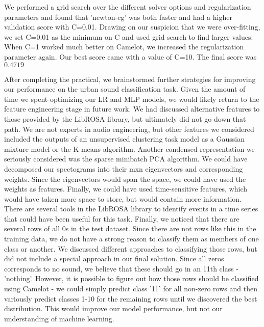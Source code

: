 \documentclass[11pt]{article}
\begin{document}
We performed a grid search over the different solver options and regularization parameters and found that 'newton-cg' was both faster and had a higher validation score with C=0.01. Drawing on our suspicion that we were over-fitting, we set C=0.01 as the minimum on C and used grid search to find larger values. When C=1 worked much better on Camelot, we increased the regularization parameter again. Our best score came with a value of C=10. The final score was $0.4719$

After completing the practical, we brainstormed further strategies for improving our performance on the urban sound classification task. Given the amount of time we spent optimizing our LR and MLP models, we would likely return to the feature engineering stage in future work. We had discussed alternative features to those provided by the LibROSA library, but ultimately did not go down that path. We are not experts in audio engineering, but other features we considered included the outputs of an unsupervised clustering task model as a Gaussian mixture model or the K-means algorithm. Another condensed representation we seriously considered was the sparse minibatch PCA algorithm. We could have decomposed our spectograms into their mxn eigenvectors and corresponding weights. Since the eigenvectors would span the space, we could have used the weights as features. Finally, we could have used time-sensitive features, which would have taken more space to store, but would contain more information. There are several tools in the LibROSA library to identify events in a time series that could have been useful for this task. Finally, we noticed that there are several rows of all 0s in the test dataset. Since there are not rows like this in the training data, we do not have a strong reason to classify them as members of one class or another. We discussed different approaches to classifying those rows, but did not include a special approach in our final solution. Since all zeros corresponds to no sound, we believe that these should go in an 11th class - 'nothing'. However, it is possible to figure out how those rows should be classified using Camelot - we could simply predict class '11' for all non-zero rows and then variously predict classes 1-10 for the remaining rows until we discovered the best distribution. This would improve our model performance, but not our understanding of machine learning.




 
\end{document}
